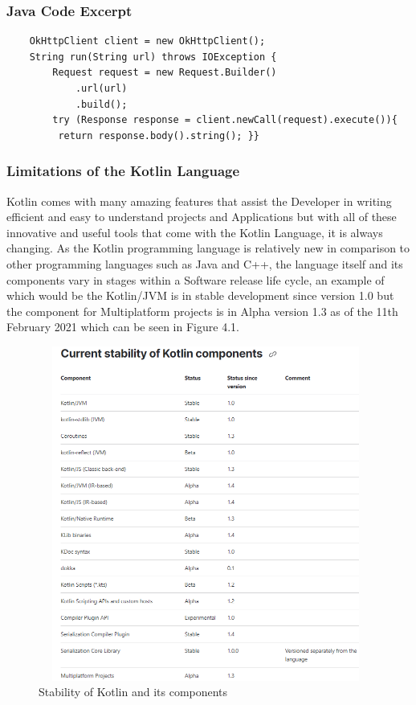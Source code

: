 \subsubsection{Java Code Excerpt}
\begin{verbatim}
    OkHttpClient client = new OkHttpClient();
    String run(String url) throws IOException {
        Request request = new Request.Builder()
            .url(url)
            .build();
        try (Response response = client.newCall(request).execute()){
         return response.body().string(); }}
\end{verbatim}

\subsubsection{Limitations of the Kotlin Language}
Kotlin comes with many amazing features that assist the Developer in writing efficient and easy to understand projects and Applications but with all of these innovative and useful tools that come with the Kotlin Language, it is always changing. As the Kotlin programming language is relatively new in comparison to other programming languages such as Java and C++, the language itself and its components vary in stages within a Software release life cycle, an example of which would be the Kotlin/JVM is in stable development since version 1.0 but the component for Multiplatform projects is in Alpha version 1.3 as of the 11th February 2021 which can be seen in Figure 4.1.
\begin{figure}[H]
    \centering
    \includegraphics[width=11cm,height = 11cm]{img/KotlinStability.PNG}
    \caption{Stability of Kotlin and its components}
    \label{fig:altas config}
\end{figure}
